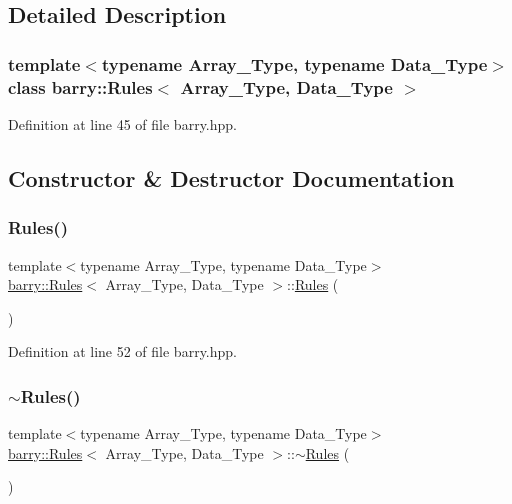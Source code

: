 \subsection{Detailed Description}
\subsubsection*{template$<$typename Array\+\_\+\+Type, typename Data\+\_\+\+Type$>$\newline
class barry\+::\+Rules$<$ Array\+\_\+\+Type, Data\+\_\+\+Type $>$}



Definition at line 45 of file barry.\+hpp.



\subsection{Constructor \& Destructor Documentation}
\mbox{\label{classbarry_1_1_rules_ac9468cdfab55a3be6675ad1fddae2bc0}} 
\subsubsection{\texorpdfstring{Rules()}{Rules()}}
{\footnotesize\ttfamily template$<$typename Array\+\_\+\+Type, typename Data\+\_\+\+Type$>$ \\
\hyperlink{classbarry_1_1_rules}{barry\+::\+Rules}$<$ Array\+\_\+\+Type, Data\+\_\+\+Type $>$\+::\hyperlink{classbarry_1_1_rules}{Rules} (\begin{DoxyParamCaption}{ }\end{DoxyParamCaption})\hspace{0.3cm}{\ttfamily [inline]}}



Definition at line 52 of file barry.\+hpp.

\mbox{\label{classbarry_1_1_rules_a287ba2cf76f83ad982c05383b5726946}} 
\subsubsection{\texorpdfstring{$\sim$\+Rules()}{~Rules()}}
{\footnotesize\ttfamily template$<$typename Array\+\_\+\+Type, typename Data\+\_\+\+Type$>$ \\
\hyperlink{classbarry_1_1_rules}{barry\+::\+Rules}$<$ Array\+\_\+\+Type, Data\+\_\+\+Type $>$\+::$\sim$\hyperlink{classbarry_1_1_rules}{Rules} (\begin{DoxyParamCaption}{ }\end{DoxyParamCaption})\hspace{0.3cm}{\ttfamily [inline]}}



